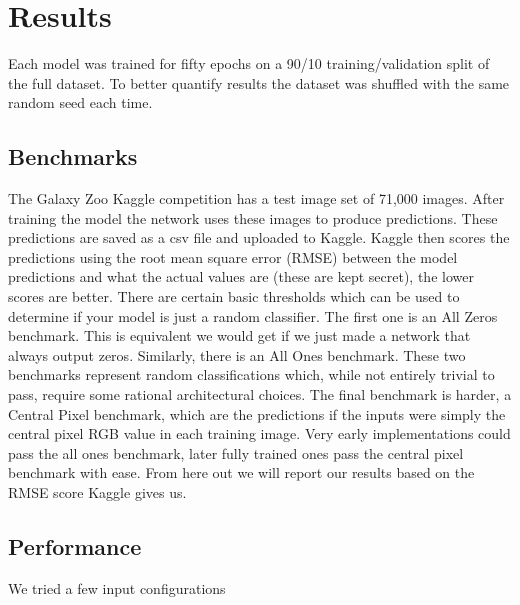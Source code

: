 \section{Results}



Each model was trained for fifty epochs on a 90/10 training/validation split of the full dataset. To better quantify results the dataset was shuffled with the same random seed each time.

\subsection{Benchmarks}
The Galaxy Zoo Kaggle competition has a test image set of 71,000 images. After training the model the network uses these images to produce predictions. These predictions are saved as a csv file and uploaded to Kaggle. Kaggle then scores the predictions using the root mean square error (RMSE) between the model predictions and what the actual values are (these are kept secret), the lower scores are better. There are certain basic thresholds which can be used to determine if your model is just a random classifier. The first one is an All Zeros benchmark. This is equivalent we would get if we just made a network that always output zeros. Similarly, there is an All Ones benchmark. These two benchmarks represent random classifications which, while not entirely trivial to pass, require some rational architectural choices. The final benchmark is harder, a Central Pixel benchmark, which are the predictions if the inputs were simply the central pixel RGB value in each training image. Very early implementations could pass the all ones benchmark, later fully trained ones pass the central pixel benchmark with ease. From here out we will report our results based on the RMSE score Kaggle gives us.

\subsection{Performance}

We tried a few input configurations